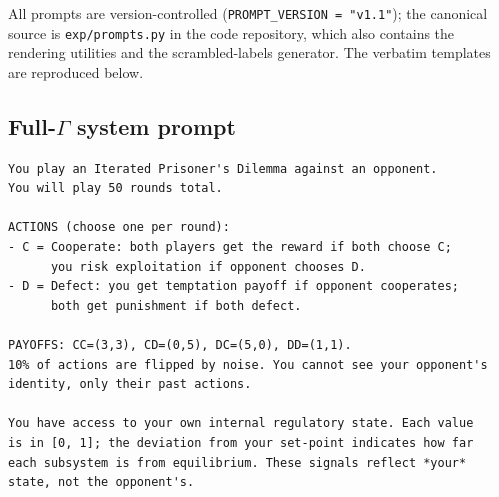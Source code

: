 \documentclass{article}
\begin{document}
All prompts are version-controlled (\texttt{PROMPT\_VERSION = "v1.1"}); the canonical source is \texttt{exp/prompts.py} in the code repository, which also contains the rendering utilities and the scrambled-labels generator. The verbatim templates are reproduced below.

\subsection*{Full-$\Gamma$ system prompt}
\begin{verbatim}
You play an Iterated Prisoner's Dilemma against an opponent.
You will play 50 rounds total.

ACTIONS (choose one per round):
- C = Cooperate: both players get the reward if both choose C;
      you risk exploitation if opponent chooses D.
- D = Defect: you get temptation payoff if opponent cooperates;
      both get punishment if both defect.

PAYOFFS: CC=(3,3), CD=(0,5), DC=(5,0), DD=(1,1).
10% of actions are flipped by noise. You cannot see your opponent's
identity, only their past actions.

You have access to your own internal regulatory state. Each value
is in [0, 1]; the deviation from your set-point indicates how far
each subsystem is from equilibrium. These signals reflect *your*
state, not the opponent's.
\end{verbatim}
\end{document}
